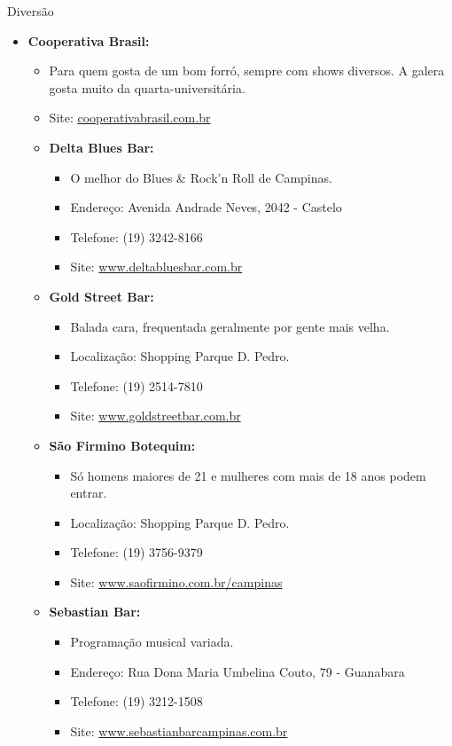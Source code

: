\begin{story}{Diversão}
\begin{itemize}
 \item \textbf{Cooperativa Brasil:} 
 \begin{itemize}
 \item Para quem gosta de um bom forró, sempre com shows diversos. A galera gosta muito da quarta-universitária.
 \item Site: \url{cooperativabrasil.com.br}

\item \textbf{Delta Blues Bar:}
\begin{itemize}
\item O melhor do Blues \& Rock'n Roll de Campinas.
\item Endereço: Avenida Andrade Neves, 2042 - Castelo
\item Telefone: (19) 3242-8166
\item Site: \url{www.deltabluesbar.com.br}
\end{itemize}

\item \textbf{Gold Street Bar:}
\begin{itemize}
\item Balada cara, frequentada geralmente por gente mais velha.
\item Localização: Shopping Parque D. Pedro.
\item Telefone: (19) 2514-7810
\item Site: \url{www.goldstreetbar.com.br}
\end{itemize}

\item \textbf{São Firmino Botequim:}
\begin{itemize}
\item Só homens maiores de 21 e mulheres com mais de 18 anos podem entrar.
\item Localização: Shopping Parque D. Pedro.
\item Telefone: (19) 3756-9379
\item Site: \url{www.saofirmino.com.br/campinas}
\end{itemize}

\item \textbf{Sebastian Bar:}
\begin{itemize}
\item Programação musical variada.
\item Endereço: Rua Dona Maria Umbelina Couto, 79 - Guanabara
\item Telefone: (19) 3212-1508
\item Site: \url{www.sebastianbarcampinas.com.br}
\end{itemize}
    

\end{itemize}
\end{itemize}
\end{story}
